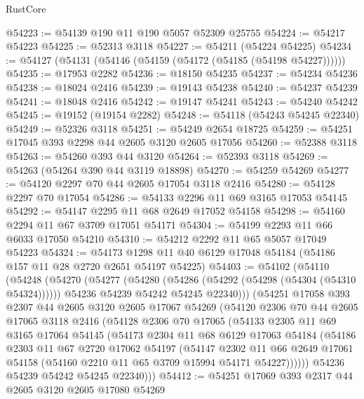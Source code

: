 \begin{lexlean}{RustCore}
\begin{coremodule}
@54223 := @54139 @190 @11 @190 @5057 @52309 @25755
@54224 := @54217 @54223
@54225 := @52313 @3118
@54227 := @54211 (@54224 @54225)
@54234 := @54127 (@54131 (@54146 (@54159 (@54172 (@54185 (@54198 @54227))))))
@54235 := @17953 @2282
@54236 := @18150 @54235
@54237 := @54234 @54236
@54238 := @18024 @2416
@54239 := @19143 @54238
@54240 := @54237 @54239
@54241 := @18048 @2416
@54242 := @19147 @54241
@54243 := @54240 @54242
@54245 := @19152 (@19154 @2282)
@54248 := @54118 (@54243 @54245 @22340)
@54249 := @52326 @3118
@54251 := @54249 @2654 @18725
@54259 := @54251 @17045 @393 @2298 @44 @2605 @3120 @2605 @17056
@54260 := @52388 @3118
@54263 := @54260 @393 @44 @3120
@54264 := @52393 @3118
@54269 := @54263 (@54264 @390 @44 @3119 @18898)
@54270 := @54259 @54269
@54277 := @54120 @2297 @70 @44 @2605 @17054 @3118 @2416
@54280 := @54128 @2297 @70 @17054
@54286 := @54133 @2296 @11 @69 @3165 @17053 @54145
@54292 := @54147 @2295 @11 @68 @2649 @17052 @54158
@54298 := @54160 @2294 @11 @67 @3709 @17051 @54171
@54304 := @54199 @2293 @11 @66 @6033 @17050 @54210
@54310 := @54212 @2292 @11 @65 @5057 @17049 @54223
@54324 := @54173 @1298 @11 @40 @6129 @17048 @54184 (@54186 @157 @11 @28 @2720 @2651 @54197 @54225)
@54403 := @54102
    (@54110
      (@54248
        (@54270
          (@54277
            (@54280 (@54286 (@54292 (@54298 (@54304 (@54310 @54324))))))
            @54236
            @54239
            @54242
            @54245
            @22340)))
      (@54251
        @17058
        @393
        @2307
        @44
        @2605
        @3120
        @2605
        @17067
        @54269
        (@54120
          @2306
          @70
          @44
          @2605
          @17065
          @3118
          @2416
          (@54128
            @2306
            @70
            @17065
            (@54133
              @2305
              @11
              @69
              @3165
              @17064
              @54145
              (@54173
                @2304
                @11
                @68
                @6129
                @17063
                @54184
                (@54186
                  @2303
                  @11
                  @67
                  @2720
                  @17062
                  @54197
                  (@54147
                    @2302
                    @11
                    @66
                    @2649
                    @17061
                    @54158
                    (@54160 @2210 @11 @65 @3709 @15994 @54171 @54227))))))
          @54236
          @54239
          @54242
          @54245
          @22340)))
@54412 := @54251 @17069 @393 @2317 @44 @2605 @3120 @2605 @17080 @54269

\end{coremodule}
\end{lexlean}
